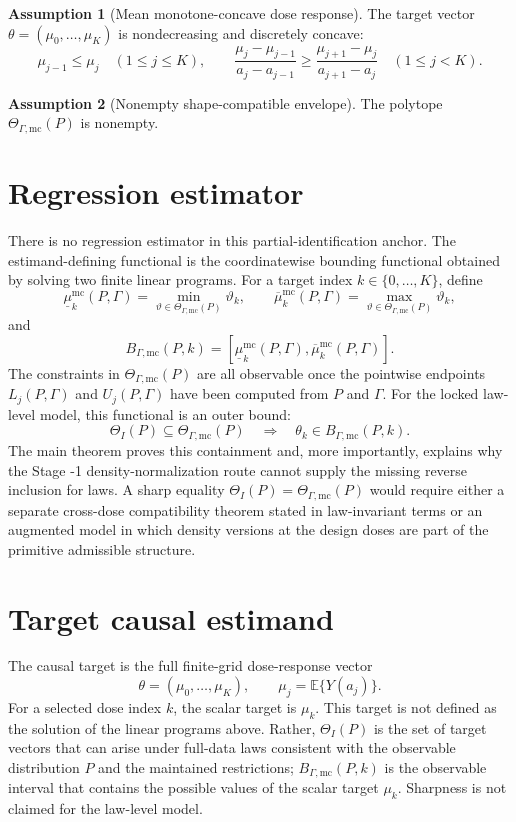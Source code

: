 \documentclass[11pt]{article}
\newcommand{\E}{\mathbb{E}}
\theoremstyle{definition}
\newtheorem{assumption}{Assumption}
\theoremstyle{plain}
\theoremstyle{remark}
\begin{document}
\begin{assumption}[Mean monotone-concave dose response]\label{ass:mc}
The target vector \(\theta=(\mu_0,\ldots,\mu_K)\) is nondecreasing and discretely concave:
\[
  \mu_{j-1}\le\mu_j\quad(1\le j\le K),
  \qquad
  \frac{\mu_j-\mu_{j-1}}{a_j-a_{j-1}}
  \ge
  \frac{\mu_{j+1}-\mu_j}{a_{j+1}-a_j}
  \quad(1\le j<K).
\]
\end{assumption}

\begin{assumption}[Nonempty shape-compatible envelope]\label{ass:nonempty}
The polytope \(\Theta_{\Gamma,\mathrm{mc}}(P)\) is nonempty.
\end{assumption}

\section{Regression estimator}
There is no regression estimator in this partial-identification anchor.  The estimand-defining functional is the coordinatewise bounding functional obtained by solving two finite linear programs.  For a target index \(k\in\{0,\ldots,K\}\), define
\[
  \underline\mu^{\mathrm{mc}}_k(P,\Gamma)
  =
  \min_{\vartheta\in\Theta_{\Gamma,\mathrm{mc}}(P)}\vartheta_k,
  \qquad
  \overline\mu^{\mathrm{mc}}_k(P,\Gamma)
  =
  \max_{\vartheta\in\Theta_{\Gamma,\mathrm{mc}}(P)}\vartheta_k,
\]
and
\[
  B_{\Gamma,\mathrm{mc}}(P,k)
  =
  [\underline\mu^{\mathrm{mc}}_k(P,\Gamma),
    \overline\mu^{\mathrm{mc}}_k(P,\Gamma)].
\]
The constraints in \(\Theta_{\Gamma,\mathrm{mc}}(P)\) are all observable once the pointwise endpoints \(L_j(P,\Gamma)\) and \(U_j(P,\Gamma)\) have been computed from \(P\) and \(\Gamma\).  For the locked law-level model, this functional is an outer bound:
\[
  \Theta_I(P)\subseteq\Theta_{\Gamma,\mathrm{mc}}(P)
  \quad\Longrightarrow\quad
  \theta_k\in B_{\Gamma,\mathrm{mc}}(P,k).
\]
The main theorem proves this containment and, more importantly, explains why the Stage -1 density-normalization route cannot supply the missing reverse inclusion for laws.  A sharp equality
\(\Theta_I(P)=\Theta_{\Gamma,\mathrm{mc}}(P)\) would require either a separate cross-dose compatibility theorem stated in law-invariant terms or an augmented model in which density versions at the design doses are part of the primitive admissible structure.

\section{Target causal estimand}
The causal target is the full finite-grid dose-response vector
\[
  \theta=(\mu_0,\ldots,\mu_K),\qquad
  \mu_j=\E\{Y(a_j)\}.
\]
For a selected dose index \(k\), the scalar target is \(\mu_k\).  This target is not defined as the solution of the linear programs above.  Rather, \(\Theta_I(P)\) is the set of target vectors that can arise under full-data laws consistent with the observable distribution \(P\) and the maintained restrictions; \(B_{\Gamma,\mathrm{mc}}(P,k)\) is the observable interval that contains the possible values of the scalar target \(\mu_k\).  Sharpness is not claimed for the law-level model.
\end{document}
